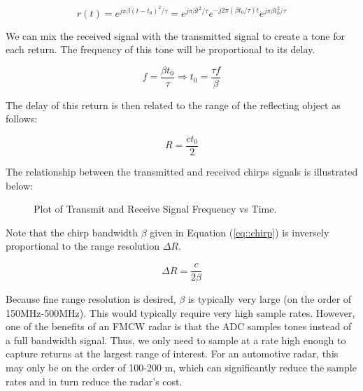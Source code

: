 \documentclass[conference]{IEEEtran}
\begin{document}
	\begin{equation}
		r(t) = e^{j\pi{\beta}(t - t_0)^2/\tau} = e^{j\pi{\beta}t^2/\tau}e^{-j2\pi({\beta}t_0/\tau)t}e^{j\pi{\beta}t_0^2/\tau}
		\label{eq::delayed_chirp}
	\end{equation}
	
	We can mix the received signal with the transmitted signal to create a tone for each return. The frequency of this tone will be proportional to its delay.
	
	\begin{equation}
		f = \frac{{\beta}t_0}{\tau} \Rightarrow t_0 = \frac{{\tau}f}{\beta}
	\end{equation}
	
	The delay of this return is then related to the range of the reflecting object as follows:
	
	\begin{equation}
		R = \frac{ct_0}{2}
	\end{equation}
	
	The relationship between the transmitted and received chirps signals is illustrated below:
	
	\begin{figure}[H]
    		\centering
    		\caption{Plot of Transmit and Receive Signal Frequency vs Time.\cite{Long2019AssistingTV}}
    		\label{fig::fmcw_spectrogram}
	\end{figure}
	
	Note that the chirp bandwidth $\beta$ given in Equation (\ref{eq::chirp}) is inversely proportional to the range resolution ${\Delta}R$.
	
	\begin{equation}
		{\Delta}R = \frac{c}{2\beta}
		\label{eq::range_resolution}
	\end{equation}
	
	Because fine range resolution is desired, $\beta$ is typically very large (on the order of 150MHz-500MHz). This would typically require very high sample rates. However, one of the benefits of an FMCW radar is that the ADC samples tones instead of a full bandwidth signal. Thus, we only need to sample at a rate high enough to capture returns at the largest range of interest. For an automotive radar, this may only be on the order of 100-200 m, which can significantly reduce the sample rates and in turn reduce the radar's cost.
	
\end{document}
